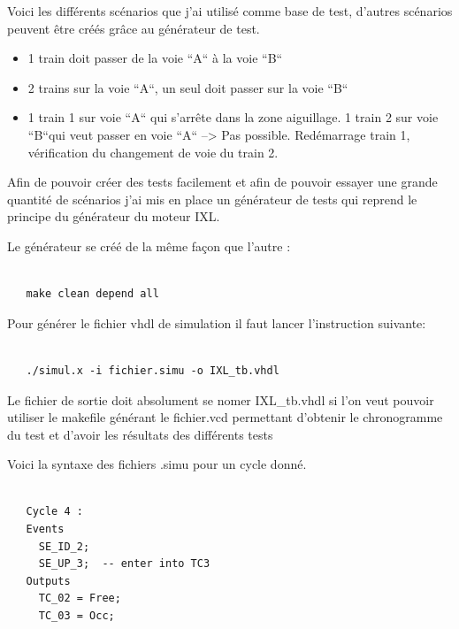 Voici les différents scénarios que j'ai utilisé comme base de test,
d'autres scénarios peuvent être créés  grâce au générateur de test.

\medskip

\begin{itemize}
    \item 1 train doit passer de la voie ``A`` à la voie ``B``
    \item 2 trains sur la voie ``A``, un seul doit passer sur la voie ``B``
    \item 1 train 1 sur voie ``A`` qui s'arrête dans la zone aiguillage.
          1 train 2 sur voie ``B``qui veut passer en voie ``A`` --> Pas
          possible. Red\'emarrage train 1, v\'erification du
          changement  de voie du train 2.
\end{itemize}

\medskip

Afin de pouvoir créer des tests facilement et afin de pouvoir essayer une
grande quantité de scénarios j'ai mis en place un générateur de tests
qui reprend le principe du générateur du moteur IXL.

\smallskip

Le générateur se créé de la même façon que l'autre :

\begin{lstlisting}

   make clean depend all

\end{lstlisting}
  
\medskip

Pour générer le fichier vhdl de simulation il faut lancer l'instruction suivante:

\begin{lstlisting}

   ./simul.x -i fichier.simu -o IXL_tb.vhdl 

\end{lstlisting}

\medskip

Le fichier de sortie doit absolument se nomer IXL\_tb.vhdl si l'on
veut pouvoir utiliser le makefile générant le fichier.vcd permettant
d'obtenir le chronogramme du test et d'avoir les résultats des
différents tests

\medskip

Voici la syntaxe des fichiers .simu pour un cycle donné.

\begin{lstlisting}

   Cycle 4 :
   Events
     SE_ID_2;  
     SE_UP_3;  -- enter into TC3	
   Outputs
     TC_02 = Free;
     TC_03 = Occ;  

\end{lstlisting}

